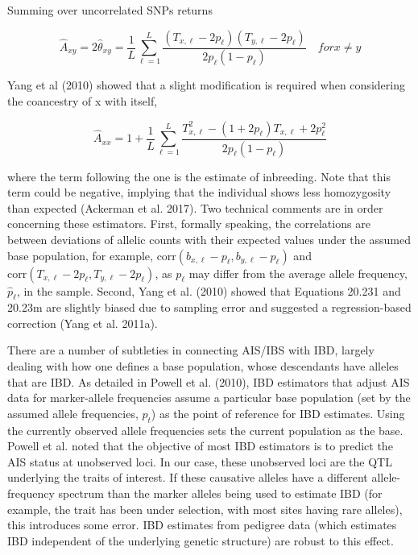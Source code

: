\documentclass{article}
\begin{document}
Summing over uncorrelated SNPs returns

\begin{equation}
\widehat{A}_{xy}=2\widehat{\theta}_{xy}=\frac{1}{L}\sum_{\ell=1}^{L}\frac{\left(T_{x,\ell}-2p_{\ell}\right)\left(T_{y,\ell}-2p_{\ell}\right)}{2p_{\ell}(1-p_{\ell})}\quad for x\neq y
\tag{20.231}
\label{eq:20_231}
\end{equation}

Yang et al (2010) showed that a slight modification is required when considering the coancestry of x with itself,

\begin{equation}
\widehat{A}_{x x}=1+\frac{1}{L}\sum_{\ell=1}^{L}\frac{T_{x,\ell}^{2}-(1+2p_{\ell})T_{x,\ell}+2p_{\ell}^{2}}{2p_{\ell}(1-p_{\ell})}
\tag{20.23m}
\label{eq:20_23m}
\end{equation}

where the term following the one is the estimate of inbreeding. Note that this term could be negative, implying that the individual shows less homozygosity than expected (Ackerman et al. 2017). Two technical comments are in order concerning these estimators. First, formally speaking, the correlations are between deviations of allelic counts with their expected values under the assumed base population, for example,  $ \text{corr}(b_{x,\ell} - p_{\ell}, b_{y,\ell} - p_{\ell}) $ and  $ \text{corr}(T_{x,\ell} - 2p_{\ell}, T_{y,\ell} - 2p_{\ell}) $, as  $ p_{\ell} $ may differ from the average allele frequency,  $ \widehat{p}_{\ell} $, in the sample. Second, Yang et al. (2010) showed that Equations 20.231 and 20.23m are slightly biased due to sampling error and suggested a regression-based correction (Yang et al. 2011a).

There are a number of subtleties in connecting AIS/IBS with IBD, largely dealing with how one defines a base population, whose descendants have alleles that are IBD. As detailed in Powell et al. (2010), IBD estimators that adjust AIS data for marker-allele frequencies assume a particular base population (set by the assumed allele frequencies,  $ p_t $) as the point of reference for IBD estimates. Using the currently observed allele frequencies sets the current population as the base. Powell et al. noted that the objective of most IBD estimators is to predict the AIS status at unobserved loci. In our case, these unobserved loci are the QTL underlying the traits of interest. If these causative alleles have a different allele-frequency spectrum than the marker alleles being used to estimate IBD (for example, the trait has been under selection, with most sites having rare alleles), this introduces some error. IBD estimates from pedigree data (which estimates IBD independent of the underlying genetic structure) are robust to this effect.
\end{document}

